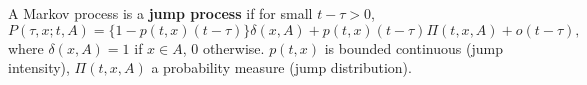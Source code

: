 A Markov process is a \textbf{jump process} if for small $t - \tau > 0$,
$$P(\tau, x; t, A) = \{1 - p(t, x)(t - \tau)\} \delta(x, A) + p(t, x)(t - \tau) \Pi(t, x, A) + o(t - \tau),$$
where $\delta(x, A) = 1$ if $x \in A$, $0$ otherwise. $p(t, x)$ is bounded continuous (jump intensity), $\Pi(t, x, A)$ a probability measure (jump distribution).

